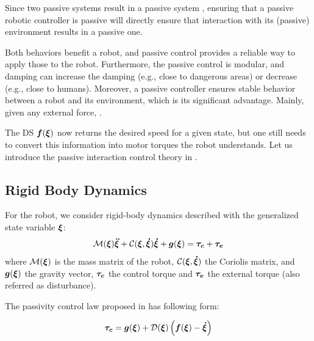 Since two passive systems result in a passive system \cite{sepulchre2012constructive}, ensuring that a passive robotic controller is passive will directly ensure that interaction with its (passive) environment results in a passive one.

Both behaviors benefit a robot, and passive control provides a reliable way to apply those to the robot.
Furthermore, the passive control is modular, and damping can increase the damping (e.g., close to dangerous areas) or decrease (e.g., close to humans). Moreover, a passive controller ensures stable behavior between a robot and its environment, which is its significant advantage. Mainly, given any external force,
.

The DS $\boldsymbol{f}(\boldsymbol{\xi})$ now returns the desired speed for a given state, but one still needs to convert this information into motor torques the robot understands. Let us introduce the passive interaction control theory in \cite{kronander2015passive}.

\subsection{Rigid Body Dynamics}
For the robot, we consider rigid-body dynamics described with the generalized state variable $\boldsymbol{\xi}$:
\begin{equation}
\matd{M}(\vecs\xi)\vecs{\ddot\xi} + \matd{C}(\vecs\xi, \vecs{\dot\xi})\vecs{\dot\xi} + \vect g(\vecs\xi) = \vecs{\tau_c} + \vecs{\tau_e}
 \label{eq:robot_dynamics}
\end{equation}
where $\mathcal{M}(\boldsymbol{\xi})$ is the mass matrix of the robot, $\mathcal{C}(\boldsymbol{\xi},\boldsymbol{\dot\xi})$ the Coriolis matrix, and  $\boldsymbol{g}(\boldsymbol{\xi})$ the gravity vector, $\boldsymbol{\tau_c}$ the control torque and $\boldsymbol{\tau_e}$ the external torque (also referred as disturbance).

The passivity control law proposed in \cite{kronander2015passive} has following form:

\begin{equation}
	\vecs{\tau_c} = \vect g (\vecs\xi) 
	+ \matd{D}(\vecs\xi) \left(\vecs f(\vecs\xi) - \vecs{\dot\xi} \right) 
\label{eq:control_command}
\end{equation}

